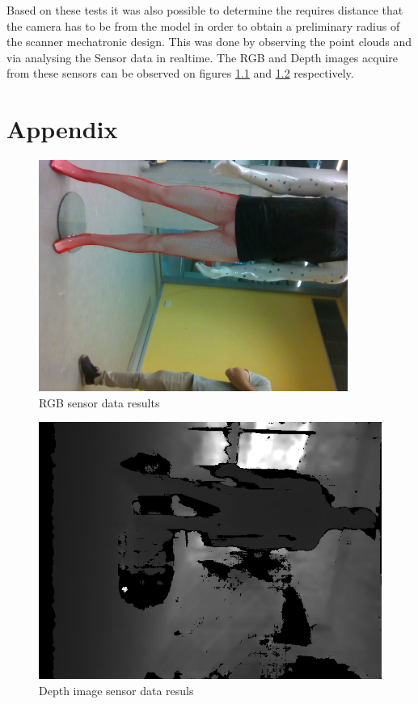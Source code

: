 \documentclass[12pt]{report}
\begin{document}
\newpage
Based on these tests it was also possible to determine the requires distance that the camera has to be from the model in order to obtain a preliminary radius of the scanner mechatronic design.
This was done by observing the point clouds and via analysing the Sensor data in realtime. The RGB and Depth images acquire from these sensors can be observed on figures \ref{fig:scanRGB} and \ref{fig:scanDepth} respectively.

\nocite{*}   %


\appendix
\chapter{Appendix}
\begin{figure}[ht]
  \centering
  \includegraphics[width=0.9\textwidth, angle=90]{scan1.png}
  \caption{RGB sensor data results}
  \label{fig:scanRGB}
\end{figure}

\newpage
\begin{figure}[ht]
  \centering
  \includegraphics[width=1\textwidth, angle=90]{scan2.png}
  \caption{Depth image sensor data resuls}
  \label{fig:scanDepth}
\end{figure}
\end{document}
